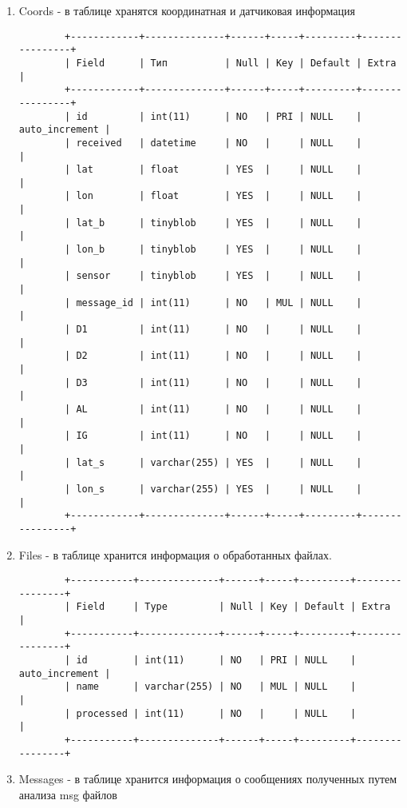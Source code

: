 \documentclass[12pt]{article}[a4paper,14pt,russian]
\begin{document}
	\begin{enumerate}
		\item Coords - в таблице хранятся координатная и датчиковая информация
		
			\begin{verbatim}
		+------------+--------------+------+-----+---------+----------------+
		| Field      | Тип          | Null | Key | Default | Extra          |
		+------------+--------------+------+-----+---------+----------------+
		| id         | int(11)      | NO   | PRI | NULL    | auto_increment |
		| received   | datetime     | NO   |     | NULL    |                |
		| lat        | float        | YES  |     | NULL    |                |
		| lon        | float        | YES  |     | NULL    |                |
		| lat_b      | tinyblob     | YES  |     | NULL    |                |
		| lon_b      | tinyblob     | YES  |     | NULL    |                |
		| sensor     | tinyblob     | YES  |     | NULL    |                |
		| message_id | int(11)      | NO   | MUL | NULL    |                |
		| D1         | int(11)      | NO   |     | NULL    |                |
		| D2         | int(11)      | NO   |     | NULL    |                |
		| D3         | int(11)      | NO   |     | NULL    |                |
		| AL         | int(11)      | NO   |     | NULL    |                |
		| IG         | int(11)      | NO   |     | NULL    |                |
		| lat_s      | varchar(255) | YES  |     | NULL    |                |
		| lon_s      | varchar(255) | YES  |     | NULL    |                |
		+------------+--------------+------+-----+---------+----------------+
		\end{verbatim}
		\item Files - в таблице хранится информация о обработанных файлах.
		
			\begin{verbatim}
		+-----------+--------------+------+-----+---------+----------------+
		| Field     | Type         | Null | Key | Default | Extra          |
		+-----------+--------------+------+-----+---------+----------------+
		| id        | int(11)      | NO   | PRI | NULL    | auto_increment |
		| name      | varchar(255) | NO   | MUL | NULL    |                |
		| processed | int(11)      | NO   |     | NULL    |                |
		+-----------+--------------+------+-----+---------+----------------+
		\end{verbatim}
		\item Messages - в таблице хранится информация о сообщениях полученных путем анализа msg файлов


\end{enumerate}
\end{document}
